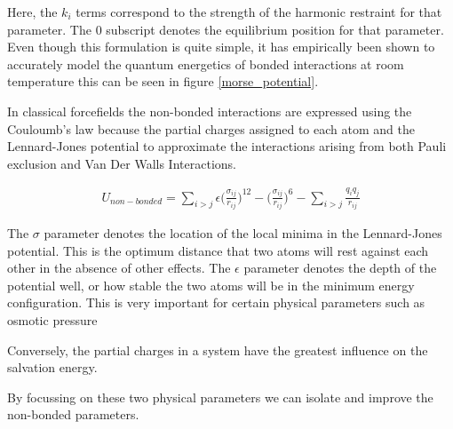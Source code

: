 Here, the $k_i$ terms correspond to the strength of the harmonic restraint for that parameter. The $0$ subscript denotes the equilibrium position for that parameter. Even though this formulation is quite simple, it has empirically been shown to accurately model the quantum energetics of bonded interactions at room temperature this can be seen in figure \ref{morse_potential}.

In classical forcefields the non-bonded interactions are expressed using the Couloumb's law because the partial charges assigned to each atom and the Lennard-Jones potential to approximate the interactions arising from both Pauli exclusion and Van Der Walls Interactions.


\begin{equation}\label{nonbonded_eqs}
	\begin{aligned}
		U_{non-bonded} = \sum_{i>j} \epsilon \Big(\frac{\sigma_{ij}}{r_{ij}}\Big)^{12} - \Big(\frac{\sigma_{ij}}{r_{ij}}\Big)^{6} - \sum_{i>j} \frac{q_i q_j } {r_{ij}}
	\end{aligned}
\end{equation}


The $\sigma$ parameter denotes the location of the local minima in the Lennard-Jones potential. This is the optimum distance that two atoms will rest against each other in the absence of other effects. The $\epsilon$ parameter denotes the depth of the potential well, or how stable the two atoms will be in the minimum energy configuration. This is very important for certain physical parameters such as osmotic pressure  \cite{Yoo2018}

Conversely, the partial charges in a system have the greatest influence on the salvation energy.

By focussing on these two physical parameters we can isolate and improve the non-bonded parameters.

